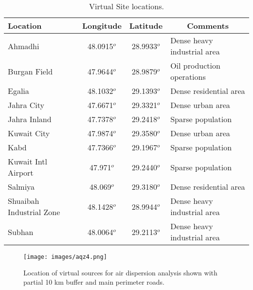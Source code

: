 \begin{table}[!htb]
\centering
\caption{Virtual Site locations.}
\label{tb:virtualsites}
\begin{tabular}{@{}lccl@{}}
\toprule
\textbf{Location}        & \textbf{Longitude} & \textbf{Latitude} & \multicolumn{1}{c}{\textbf{Comments}} \\ \midrule
Ahmadhi                  & 48.0915$^{o}$      & 28.9933$^{o}$     & Dense heavy industrial area           \\
Burgan Field             & 47.9644$^{o}$      & 28.9879$^{o}$     & Oil production operations             \\
Egalia                   & 48.1032$^{o}$      & 29.1393$^{o}$     & Dense residential area                \\
Jahra City               & 47.6671$^{o}$      & 29.3321$^{o}$     & Dense urban area                      \\
Jahra Inland             & 47.7378$^{o}$      & 29.2418$^{o}$     & Sparse population                     \\
Kuwait City              & 47.9874$^{o}$      & 29.3580$^{o}$     & Dense urban area                      \\
Kabd                     & 47.7366$^{o}$      & 29.1967$^{o}$     & Sparse population                     \\
Kuwait Intl Airport      & 47.971$^{o}$       & 29.2440$^{o}$     & Sparse population                     \\
Salmiya                  & 48.069$^{o}$       & 29.3180$^{o}$     & Dense residential area                \\
Shuaibah Industrial Zone & 48.1428$^{o}$      & 28.9944$^{o}$     & Dense heavy industrial area           \\
Subhan                   & 48.0064$^{o}$      & 29.2113$^{o}$     & Dense heavy industrial area           \\ \bottomrule
\end{tabular}
\end{table}
%
%
\begin{figure}
\texttt{[image: images/aqz4.png]} 
\caption{Location of virtual sources for air dispersion analysis shown with partial 10 km buffer and main perimeter roads.}
\label{fig:virtual-locations}
\end{figure}
%

